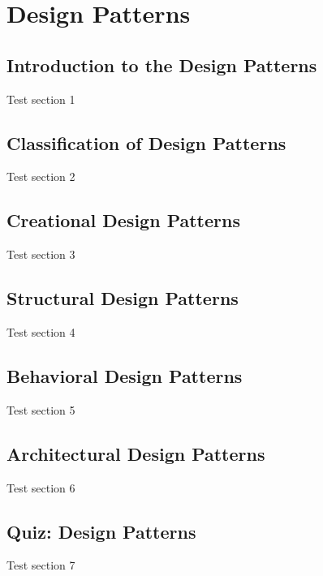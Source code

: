 \documentclass[../main.tex]{subfiles}
\begin{document}
\chapter{ Design Patterns }


\section{ Introduction to the Design Patterns }
Test section 1

\section{ Classification of Design Patterns }
Test section 2

\section{ Creational Design Patterns }
Test section 3

\section{ Structural Design Patterns }
Test section 4

\section{ Behavioral Design Patterns }
Test section 5

\section{ Architectural Design Patterns }
Test section 6

\section{ Quiz: Design Patterns }
Test section 7
\end{document}
